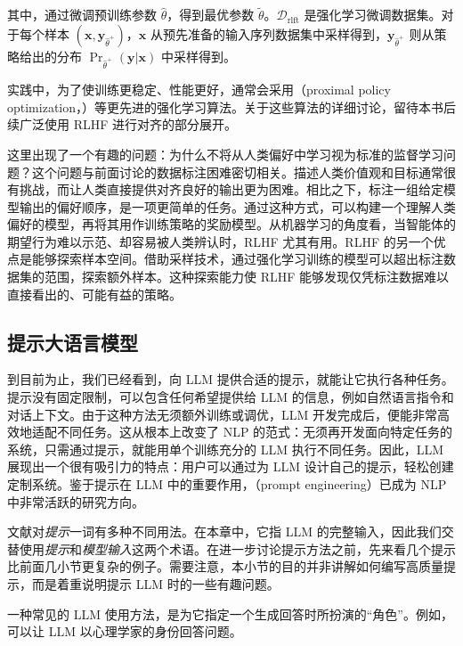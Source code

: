 \noindent 其中，通过微调预训练参数 $\hat{\theta}$，得到最优参数 $\tilde{\theta}$。$\mathcal{D}_{\mathrm{rlft}}$ 是强化学习微调数据集。对于每个样本 $(\mathbf{x},\mathbf{y}_{\hat{\theta}^+})$，$\mathbf{x}$ 从预先准备的输入序列数据集中采样得到，$\mathbf{y}_{\hat{\theta}^+}$ 则从策略给出的分布 $\mathrm{\Pr}_{\hat{\theta}^+}(\mathbf{y}|\mathbf{x})$ 中采样得到。

实践中，为了使训练更稳定、性能更好，通常会采用（proximal policy optimization，）等更先进的强化学习算法。关于这些算法的详细讨论，留待本书后续广泛使用 RLHF 进行对齐的部分展开。

这里出现了一个有趣的问题：为什么不将从人类偏好中学习视为标准的监督学习问题？这个问题与前面讨论的数据标注困难密切相关。描述人类价值观和目标通常很有挑战，而让人类直接提供对齐良好的输出更为困难。相比之下，标注一组给定模型输出的偏好顺序，是一项更简单的任务。通过这种方式，可以构建一个理解人类偏好的模型，再将其用作训练策略的奖励模型。从机器学习的角度看，当智能体的期望行为难以示范、却容易被人类辨认时，RLHF 尤其有用。RLHF 的另一个优点是能够探索样本空间。借助采样技术，通过强化学习训练的模型可以超出标注数据集的范围，探索额外样本。这种探索能力使 RLHF 能够发现仅凭标注数据难以直接看出的、可能有益的策略。

\subsection{提示大语言模型}

\noindent 到目前为止，我们已经看到，向 LLM 提供合适的提示，就能让它执行各种任务。提示没有固定限制，可以包含任何希望提供给 LLM 的信息，例如自然语言指令和对话上下文。由于这种方法无须额外训练或调优，LLM 开发完成后，便能非常高效地适配不同任务。这从根本上改变了 NLP 的范式：无须再开发面向特定任务的系统，只需通过提示，就能用单个训练充分的 LLM 执行不同任务。因此，LLM 展现出一个很有吸引力的特点：用户可以通过为 LLM 设计自己的提示，轻松创建定制系统。鉴于提示在 LLM 中的重要作用，（prompt engineering）已成为 NLP 中非常活跃的研究方向。

文献对\textit{提示}一词有多种不同用法。在本章中，它指 LLM 的完整输入，因此我们交替使用\textit{提示}和\textit{模型输入}这两个术语。在进一步讨论提示方法之前，先来看几个提示比前面几小节更复杂的例子。需要注意，本小节的目的并非讲解如何编写高质量提示，而是着重说明提示 LLM 时的一些有趣问题。

一种常见的 LLM 使用方法，是为它指定一个生成回答时所扮演的“角色”。例如，可以让 LLM 以心理学家的身份回答问题。

